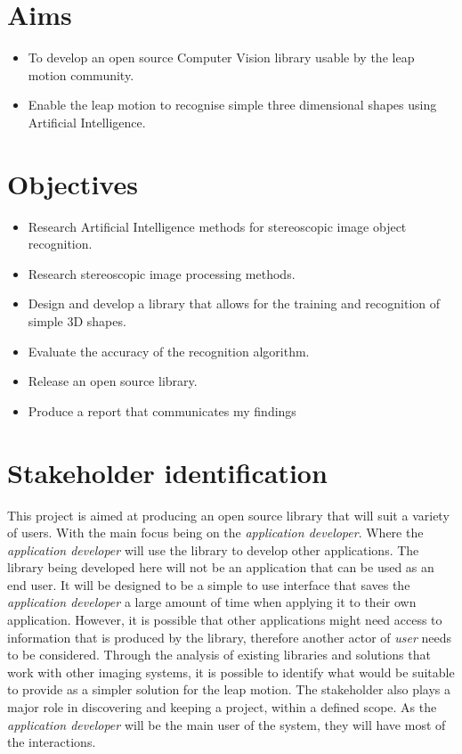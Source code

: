 \documentclass[11pt,oneside]{report}
\begin{document}
		\section{Aims} 
		\begin{itemize}
			\item To develop an open source Computer Vision library usable by the leap motion community.
			\item Enable the leap motion to recognise simple three dimensional shapes using Artificial Intelligence.
		\end{itemize}
		\section{Objectives} 
		\begin{itemize}
			\item Research Artificial Intelligence methods for stereoscopic image object recognition.
			\item Research stereoscopic image processing methods.
			\item Design and develop a library that allows for the training and recognition of simple 3D shapes.
			\item Evaluate the accuracy of the recognition algorithm.
			\item Release an open source library.
			\item Produce a report that communicates my findings
		\end{itemize}
		\section{Stakeholder identification}
			This project is aimed at producing an open source library that will suit a variety of users.
			With the main focus being on the \textit{application developer}.
			Where the \textit{application developer} will use the library to develop other applications.
			The library being developed here will not be an application that can be used as an end user.
			It will be designed to be a simple to use interface that saves the \textit{application developer} a large amount of time when applying it to their own application.
			However, it is possible that other applications might need access to information that is produced by the library, therefore another actor of \textit{user} needs to be considered.
			Through the analysis of existing libraries and solutions that work with other imaging systems, it is possible to identify what would be suitable to provide as a simpler solution for the leap motion.
			The stakeholder also plays a major role in discovering and keeping a project, within a defined scope.
			As the \textit{application developer} will be the main user of the system, they will	have most of the interactions.
		
\end{document}
